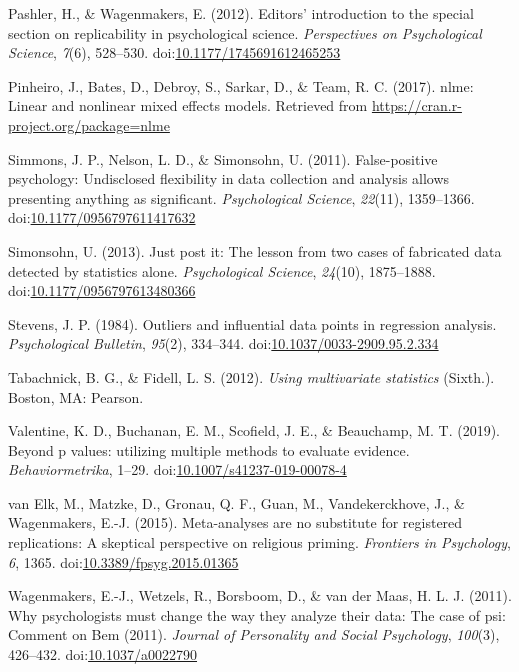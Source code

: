 \documentclass[english,,man,mask]{apa6}
\theoremstyle{definition}
\theoremstyle{definition}
\theoremstyle{definition}
\theoremstyle{remark}
\begin{document}
\hypertarget{ref-Pashler2012a}{}
Pashler, H., \& Wagenmakers, E. (2012). Editors' introduction to the
special section on replicability in psychological science.
\emph{Perspectives on Psychological Science}, \emph{7}(6), 528--530.
doi:\href{https://doi.org/10.1177/1745691612465253}{10.1177/1745691612465253}

\hypertarget{ref-Pinheiro2017}{}
Pinheiro, J., Bates, D., Debroy, S., Sarkar, D., \& Team, R. C. (2017).
nlme: Linear and nonlinear mixed effects models. Retrieved from
\url{https://cran.r-project.org/package=nlme}

\hypertarget{ref-Simmons2011}{}
Simmons, J. P., Nelson, L. D., \& Simonsohn, U. (2011). False-positive
psychology: Undisclosed flexibility in data collection and analysis
allows presenting anything as significant. \emph{Psychological Science},
\emph{22}(11), 1359--1366.
doi:\href{https://doi.org/10.1177/0956797611417632}{10.1177/0956797611417632}

\hypertarget{ref-Simonsohn2013}{}
Simonsohn, U. (2013). Just post it: The lesson from two cases of
fabricated data detected by statistics alone. \emph{Psychological
Science}, \emph{24}(10), 1875--1888.
doi:\href{https://doi.org/10.1177/0956797613480366}{10.1177/0956797613480366}

\hypertarget{ref-Stevens1984}{}
Stevens, J. P. (1984). Outliers and influential data points in
regression analysis. \emph{Psychological Bulletin}, \emph{95}(2),
334--344.
doi:\href{https://doi.org/10.1037/0033-2909.95.2.334}{10.1037/0033-2909.95.2.334}

\hypertarget{ref-Tabachnick2012}{}
Tabachnick, B. G., \& Fidell, L. S. (2012). \emph{Using multivariate
statistics} (Sixth.). Boston, MA: Pearson.

\hypertarget{ref-Valentine2017}{}
Valentine, K. D., Buchanan, E. M., Scofield, J. E., \& Beauchamp, M. T.
(2019). Beyond p values: utilizing multiple methods to evaluate
evidence. \emph{Behaviormetrika}, 1--29.
doi:\href{https://doi.org/10.1007/s41237-019-00078-4}{10.1007/s41237-019-00078-4}

\hypertarget{ref-VanElk2015}{}
van Elk, M., Matzke, D., Gronau, Q. F., Guan, M., Vandekerckhove, J., \&
Wagenmakers, E.-J. (2015). Meta-analyses are no substitute for
registered replications: A skeptical perspective on religious priming.
\emph{Frontiers in Psychology}, \emph{6}, 1365.
doi:\href{https://doi.org/10.3389/fpsyg.2015.01365}{10.3389/fpsyg.2015.01365}

\hypertarget{ref-Wagenmakers2011a}{}
Wagenmakers, E.-J., Wetzels, R., Borsboom, D., \& van der Maas, H. L. J.
(2011). Why psychologists must change the way they analyze their data:
The case of psi: Comment on Bem (2011). \emph{Journal of Personality and
Social Psychology}, \emph{100}(3), 426--432.
doi:\href{https://doi.org/10.1037/a0022790}{10.1037/a0022790}
\end{document}
